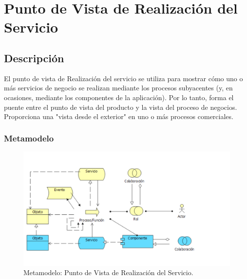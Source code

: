 \section{Punto de Vista de Realización del Servicio}
\subsection{Descripción}
El punto de vista de Realización del servicio se utiliza para mostrar cómo uno o más servicios de negocio se realizan mediante los procesos subyacentes (y, en ocasiones, mediante los componentes de la aplicación). Por lo tanto, forma el puente entre el punto de vista del producto y la vista del proceso de negocios. Proporciona una "vista desde el exterior" en uno o más procesos comerciales.

\subsubsection{Metamodelo}
\begin{figure}[H]
	\centering
	\includegraphics[width=1.0\textwidth]{imagenes/Metamodelos/Tecnologia/meta_realizacion_servicio.PDF}
	\caption{Metamodelo: Punto de Vista de Realización del Servicio.}
	\label{fig:gap_analysis}
\end{figure}

